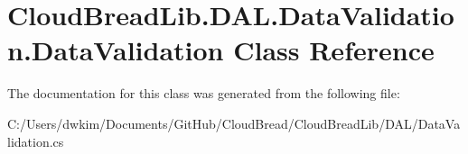 \hypertarget{class_cloud_bread_lib_1_1_d_a_l_1_1_data_validation_1_1_data_validation}{}\section{Cloud\+Bread\+Lib.\+D\+A\+L.\+Data\+Validation.\+Data\+Validation Class Reference}
\label{class_cloud_bread_lib_1_1_d_a_l_1_1_data_validation_1_1_data_validation}


The documentation for this class was generated from the following file\+:\begin{DoxyCompactItemize}
\item 
C\+:/\+Users/dwkim/\+Documents/\+Git\+Hub/\+Cloud\+Bread/\+Cloud\+Bread\+Lib/\+D\+A\+L/Data\+Validation.\+cs\end{DoxyCompactItemize}

